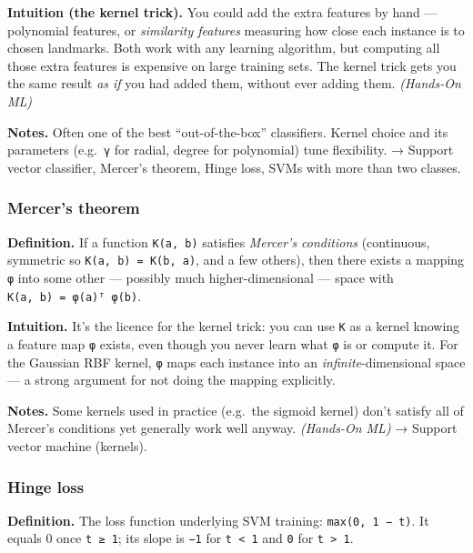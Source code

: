\documentclass[
  10pt,
  letterpaper,
  onecolumn]{article}
\begin{document}
\textbf{Intuition (the kernel trick).} You could add the extra features
by hand --- polynomial features, or \emph{similarity features} measuring
how close each instance is to chosen landmarks. Both work with any
learning algorithm, but computing all those extra features is expensive
on large training sets. The kernel trick gets you the same result
\emph{as if} you had added them, without ever adding them.
\emph{(Hands-On ML)}

\textbf{Notes.} Often one of the best ``out-of-the-box'' classifiers.
Kernel choice and its parameters (e.g.~\texttt{γ} for radial, degree for
polynomial) tune flexibility. → Support vector classifier, Mercer's
theorem, Hinge loss, SVMs with more than two classes.

\hypertarget{mercers-theorem}{%
\subsubsection{Mercer's theorem}\label{mercers-theorem}}

\textbf{Definition.} If a function \texttt{K(a,\ b)} satisfies
\emph{Mercer's conditions} (continuous, symmetric so
\texttt{K(a,\ b)\ =\ K(b,\ a)}, and a few others), then there exists a
mapping \texttt{φ} into some other --- possibly much higher-dimensional
--- space with \texttt{K(a,\ b)\ =\ φ(a)ᵀ\ φ(b)}.

\textbf{Intuition.} It's the licence for the kernel trick: you can use
\texttt{K} as a kernel knowing a feature map \texttt{φ} exists, even
though you never learn what \texttt{φ} is or compute it. For the
Gaussian RBF kernel, \texttt{φ} maps each instance into an
\emph{infinite}-dimensional space --- a strong argument for not doing
the mapping explicitly.

\textbf{Notes.} Some kernels used in practice (e.g.~the sigmoid kernel)
don't satisfy all of Mercer's conditions yet generally work well anyway.
\emph{(Hands-On ML)} → Support vector machine (kernels).

\hypertarget{hinge-loss}{%
\subsubsection{Hinge loss}\label{hinge-loss}}

\textbf{Definition.} The loss function underlying SVM training:
\texttt{max(0,\ 1\ −\ t)}. It equals 0 once \texttt{t\ ≥\ 1}; its slope
is \texttt{−1} for \texttt{t\ \textless{}\ 1} and \texttt{0} for
\texttt{t\ \textgreater{}\ 1}.
\end{document}
